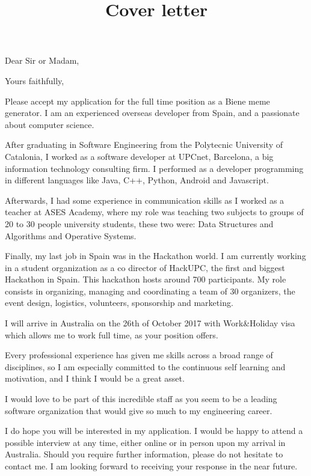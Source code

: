 \documentclass[11pt,a4paper,sans]{moderncv}        %
\title{Cover letter}                               	%
\newcommand{\CompanyPosition}{Biene meme generator}
\begin{document}
\opening{Dear Sir or Madam,}
\closing{Yours faithfully,}

\makelettertitle

\justify
Please accept my application for the full time position as a \CompanyPosition\space. I am an experienced overseas developer from Spain, and a passionate about computer science.

\justify
After graduating in Software Engineering from the Polytecnic University of Catalonia, I worked as a software developer at UPCnet, Barcelona, a big information technology consulting firm. I performed as a developer programming in different languages like Java, C++, Python, Android and Javascript.

\justify
Afterwards, I had some experience in communication skills as I worked as a teacher at ASES Academy, where my role was teaching two subjects to groups of 20 to 30 people university students, these two were: Data Structures and Algorithms and Operative Systems.

\justify
Finally, my last job in Spain was in the Hackathon world. I am currently working in a student organization as a co director of HackUPC, the first and biggest Hackathon in Spain. This hackathon hosts around 700 participants. My role consists in organizing, managing and coordinating a team of 30 organizers, the event design, logistics, volunteers, sponsorship and marketing.

\justify
I will arrive in Australia on the 26th of October 2017 with Work\&Holiday visa which allows me to work full time, as your position offers.

\justify
Every professional experience has given me skills across a broad range of disciplines, so I am especially committed to the continuous self learning and motivation, and I think I would be a great asset.

\justify
I would love to be part of this incredible staff as you seem to be a leading software organization that would give so much to my engineering career.

\justify
I do hope you will be interested in my application. I would be happy to attend a possible interview at any time, either online or in person upon my arrival in Australia. Should you require further information, please do not hesitate to contact me. I am looking forward to receiving your response in the near future.

\makeletterclosing
\end{document}
